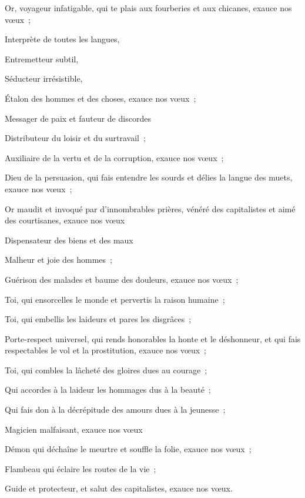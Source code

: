 \documentclass[french,twoside]{book} %
\newcommand{\astermono}{\medskip\centerline{\color{rubric}\large\selectfont{\syms ✻}}\medskip\par}%
\begin{document}
\noindent Or, voyageur infatigable, qui te plais aux fourberies et aux chicanes, exauce nos vœux ;\par
Interprète de toutes les langues,\par
Entremetteur subtil,\par
Séducteur irrésistible,\par
Étalon des hommes et des choses, exauce nos vœux ;\par
Messager de paix et fauteur de discordes\par
Distributeur du loisir et du surtravail ;\par
Auxiliaire de la vertu et de la corruption, exauce nos vœux ;\par
Dieu de la persuasion, qui fais entendre les sourds et délies la langue des muets, exauce nos vœux ;\par
Or maudit et invoqué par d’innombrables prières, vénéré des capitalistes et aimé des courtisanes, exauce nos vœux\par
Dispensateur des biens et des maux\par
Malheur et joie des hommes ;\par
Guérison des malades et baume des douleurs, exauce nos vœux ;\par
Toi, qui ensorcelles le monde et pervertis la raison humaine ;\par
Toi, qui embellis les laideurs et pares les disgrâces ;\par
Porte-respect universel, qui rends honorables la honte et le déshonneur, et qui fais respectables le vol et la prostitution, exauce nos vœux ;\par
Toi, qui combles la lâcheté des gloires dues au courage ;\par
Qui accordes à la laideur les hommages dus à la beauté ;\par
Qui fais don à la décrépitude des amours dues à la jeunesse ;\par
Magicien malfaisant, exauce nos vœux\par
Démon qui déchaîne le meurtre et souffle la folie, exauce nos vœux ;\par
Flambeau qui éclaire les routes de la vie ;\par
Guide et protecteur, et salut des capitalistes, exauce nos vœux.\par

\astermono
\end{document}
